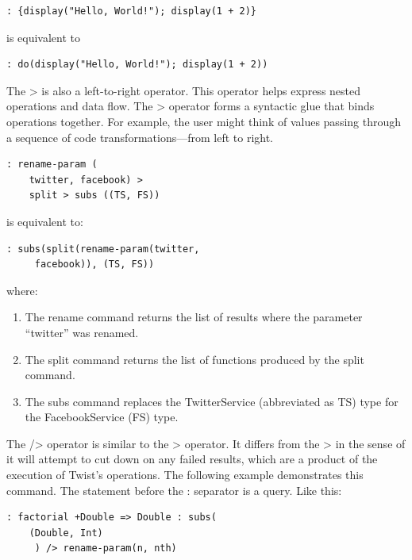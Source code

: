 \begin{verbatim}
: {display("Hello, World!"); display(1 + 2)}
\end{verbatim}

is equivalent to

\begin{verbatim}
: do(display("Hello, World!"); display(1 + 2))
\end{verbatim}

The > is also a left-to-right operator. This operator helps express nested operations and data flow.  The > operator forms a syntactic glue that binds operations together. For example, the user might think of values passing through a sequence of code transformations---from left to right.

\begin{verbatim}
: rename-param (
	twitter, facebook) > 
	split > subs ((TS, FS))
\end{verbatim}

is equivalent to:

\begin{verbatim}
: subs(split(rename-param(twitter, 
	 facebook)), (TS, FS))
\end{verbatim}

where:

\begin{enumerate}
	\item The rename command returns the list of results where the parameter ``twitter'' was 
	renamed.
	\item The split command returns the list of functions produced by the split command.
	\item The subs command replaces the TwitterService (abbreviated as TS) type for the 
	FacebookService (FS) type.
\end{enumerate}

The /> operator is similar to the > operator. It differs from the > in the sense of it will attempt to cut down on any failed results, which are a product of the execution of Twist's operations. The following example demonstrates this command. The statement before the : separator is a query. Like this:

\begin{verbatim}
: factorial +Double => Double : subs(
	(Double, Int)
	 ) /> rename-param(n, nth) 
\end{verbatim}

